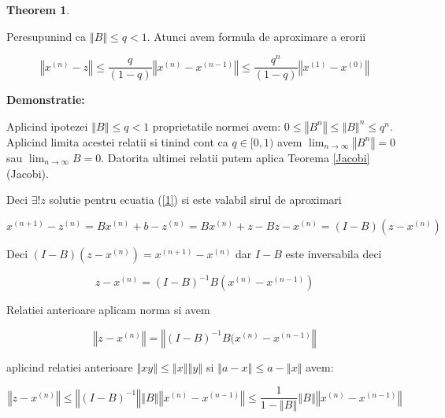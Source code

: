 \documentclass[a4paper,twoside]{book}
\newtheorem{theorem}{Theorem}
\begin{document}
\begin{theorem}
\bigskip \label{Teorema2}
\end{theorem}

Peresupunind ca $\left\Vert B\right\Vert \leq q<1$. Atunci avem formula de
aproximare a erorii

\begin{equation*}
\left\Vert x^{(n)}-z\right\Vert \leq \frac{q}{(1-q)}\left\Vert
x^{(n)}-x^{(n-1)}\right\Vert \leq \frac{q^{n}}{(1-q)}\left\Vert
x^{(1)}-x^{(0)}\right\Vert
\end{equation*}

\textbf{Demonstratie:}

Aplicind ipotezei $\left\Vert B\right\Vert \leq q<1$ proprietatile normei
avem: $0\leq \left\Vert B^{n}\right\Vert \leq \left\Vert B\right\Vert
^{n}\leq q^{n}$. Aplicind limita acestei relatii si tinind cont ca $q\in
\lbrack 0,1)$ avem $\lim_{n\rightarrow \infty }\left\Vert B^{n}\right\Vert
=0 $ sau $\lim_{n\rightarrow \infty }B=0$. Datorita ultimei relatii putem
aplica Teorema \ref{Jacobi} (Jacobi).

Deci $\exists !z$ solutie pentru ecuatia (\ref{1}) si este valabil sirul de
aproximari

\begin{equation*}
x^{(n+1)}-z^{(n)}=Bx^{(n)}+b-z^{(n)}=Bx^{(n)}+z-Bz-x^{(n)}=(I-B)(z-x^{(n)})
\end{equation*}

Deci $(I-B)(z-x^{(n)})=x^{(n+1)}-x^{(n)}$ dar $I-B$ este inversabila deci

\begin{equation*}
z-x^{(n)}=(I-B)^{-1}B(x^{(n)}-x^{(n-1)})
\end{equation*}

Relatiei anterioare aplicam norma si avem

\begin{equation*}
\left\Vert z-x^{(n)}\right\Vert =\left\Vert
(I-B)^{-1}B(x^{(n)}-x^{(n-1)}\right\Vert
\end{equation*}

aplicind relatiei anterioare $\left\Vert xy\right\Vert \leq \left\Vert
x\right\Vert \left\Vert y\right\Vert $ si $\left\Vert a-x\right\Vert \leq
a-\left\Vert x\right\Vert $ avem:

\begin{equation*}
\left\Vert z-x^{(n)}\right\Vert \leq \left\Vert (I-B)^{-1}\right\Vert
\left\Vert B\right\Vert \left\Vert x^{(n)}-x^{(n-1)}\right\Vert \leq \frac{1%
}{1-\left\Vert B\right\Vert }\left\Vert B\right\Vert \left\Vert
x^{(n)}-x^{(n-1)}\right\Vert
\end{equation*}
\end{document}
